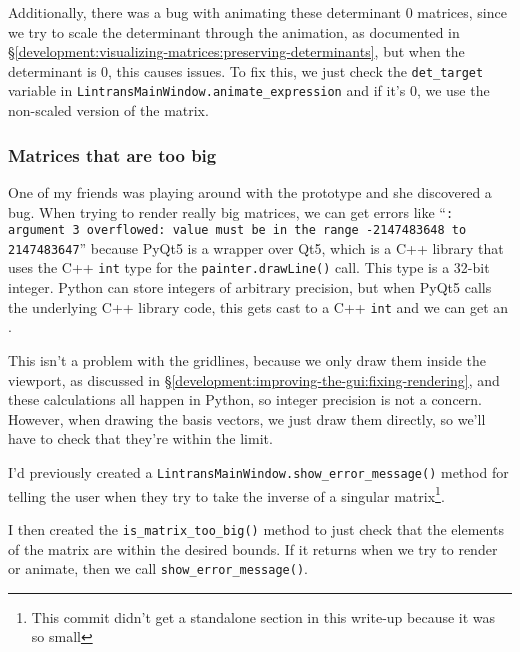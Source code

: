 \documentclass[../development.tex]{subfiles}
\begin{document}
Additionally, there was a bug with animating these determinant 0 matrices, since we try to scale the determinant through the animation, as documented in \S\ref{development:visualizing-matrices:preserving-determinants}, but when the determinant is 0, this causes issues. To fix this, we just check the \texttt{det_target} variable in \texttt{LintransMainWindow.animate_expression} and if it's 0, we use the non-scaled version of the matrix.


\subsubsection{Matrices that are too big\label{development:improving-the-gui:matrices-that-are-too-big}}

One of my friends was playing around with the prototype and she discovered a bug. When trying to render really big matrices, we can get errors like \enquote{\texttt{: argument 3 overflowed: value must be in the range -2147483648 to 2147483647}} because PyQt5 is a wrapper over Qt5, which is a C++ library that uses the C++ \texttt{int} type for the \texttt{painter.drawLine()} call. This type is a 32-bit integer. Python can store integers of arbitrary precision, but when PyQt5 calls the underlying C++ library code, this gets cast to a C++ \texttt{int} and we can get an .

This isn't a problem with the gridlines, because we only draw them inside the viewport, as discussed in \S\ref{development:improving-the-gui:fixing-rendering}, and these calculations all happen in Python, so integer precision is not a concern. However, when drawing the basis vectors, we just draw them directly, so we'll have to check that they're within the limit.

I'd previously created a \texttt{LintransMainWindow.show_error_message()} method for telling the user when they try to take the inverse of a singular matrix\footnote{This commit didn't get a standalone section in this write-up because it was so small}.


I then created the \texttt{is_matrix_too_big()} method to just check that the elements of the matrix are within the desired bounds. If it returns  when we try to render or animate, then we call \texttt{show_error_message()}.
\end{document}
